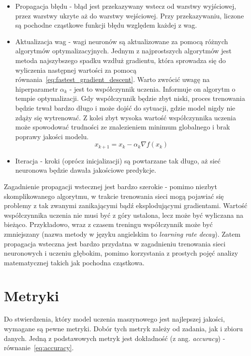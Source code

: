 \begin{itemize}
    \item Propagacja błędu - błąd jest przekazywany wstecz od warstwy wyjściowej, przez warstwy ukryte aż do warstwy wejściowej.
    Przy przekazywaniu, liczone są pochodne cząstkowe funkcji błędu względem każdej z wag.
    \item Aktualizacja wag - wagi neuronów są aktualizowane za pomocą różnych algorytmów optymalizacyjnych.
    Jednym z najprostszych algorytmów jest metoda najszybszego spadku wzdłuż gradientu, która sprowadza się do wyliczenia następnej wartości za pomocą równania~\ref{eq:fastest_gradient_descent}.
    Warto zwrócić uwagę na hiperparametr $\alpha_k$ - jest to współczynnik uczenia.
    Informuje on algorytm o tempie optymalizacji.
    Gdy współczynnik będzie zbyt niski, proces trenowania będzie trwał bardzo długo i może dojść do sytuacji, gdzie model nigdy nie zdąży się wytrenować.
    Z kolei zbyt wysoka wartość współczynnika uczenia może spowodować trudności ze znalezieniem minimum globalnego i brak poprawy jakości modelu.
    \begin{equation}
        x_{k+1} = x_k - \alpha_k \nabla f(x_k)\label{eq:fastest_gradient_descent}
    \end{equation}
    \item Iteracja - kroki (oprócz inicjalizacji) są powtarzane tak długo, aż sieć neuronowa będzie dawała jakościowe predykcje.
\end{itemize}

Zagadnienie propagacji wstecznej jest bardzo szerokie - pomimo niezbyt skomplikowanego algorytmu, w trakcie trenowania sieci mogą pojawiać się problemy z tak zwanymi zanikającymi bądź eksplodującymi gradientami.
Wartość współczynnika uczenia nie musi być z góry ustalona, lecz może być wyliczana na bieżąco.
Przykładowo, wraz z czasem treningu współczynnik może być zmniejszany (nazwa metody w języku angielskim to \textit{learning rate decay}).
Zatem propagacja wsteczna jest bardzo przydatna w zagadnieniu trenowania sieci neuronowych i uczeniu głębokim, pomimo korzystania z prostych pojęć analizy matematycznej takich jak pochodna cząstkowa.


\section{Metryki}

Do stwierdzenia, który model uczenia maszynowego jest najlepszej jakości, wymagane są pewne metryki.
Dobór tych metryk zależy od zadania, jak i zbioru danych.
Jedną z podstawowych metryk jest dokładność (z ang. \textit{accuracy}) - równanie~\ref{eq:accuracy}.

